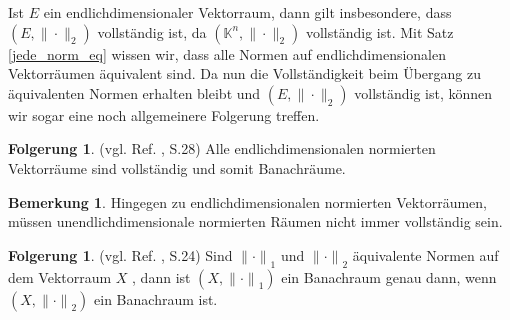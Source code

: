 \documentclass[10pt,a4paper]{article}
\theoremstyle{plain}
\theoremstyle{definition}
\newtheorem{folgerung}[satz]{Folgerung}
\newenvironment{fol}{\begin{shaded}\begin{folgerung}}{\end{folgerung}\end{shaded}}
\theoremstyle{nonumberplain}
\newtheorem{bemerkung}{Bemerkung}
\newenvironment{bem}{\begin{bemerkung}}{\end{bemerkung}}
\newcommand{\K}{\mathbb{K}}
\begin{document}
Ist $E$ ein endlichdimensionaler Vektorraum, dann gilt insbesondere, dass $(E, \|\cdot\|_2)$ vollständig ist, da $(\K^n, \|\cdot\|_2)$ vollständig ist.
Mit Satz \hyperref[jede_norm_eq]{\ref*{jede_norm_eq}} wissen wir, dass alle Normen auf endlichdimensionalen Vektorräumen äquivalent sind. Da nun die Vollständigkeit beim Übergang zu äquivalenten Normen erhalten bleibt und $(E, \|\cdot\|_2)$ vollständig ist, können wir sogar eine noch allgemeinere Folgerung treffen. 
\begin{fol}
\label{vollundendlich}
(vgl. Ref. \cite{Clason}, S.28) Alle endlichdimensionalen normierten Vektorräume sind vollständig und somit Banachräume.
\end{fol}
\begin{bem}
Hingegen zu endlichdimensionalen normierten Vektorräumen, müssen unendlichdimensionale normierten Räumen nicht immer vollständig sein.
\end{bem}
\begin{fol}
(vgl. Ref. \cite{Clason}, S.24) Sind ${\|\cdot\|}_1$ und ${\|\cdot\|}_2$ äquivalente Normen auf dem Vektorraum $X$ , dann ist $(X , {\|\cdot\|}_1)$ ein Banachraum genau dann, wenn $(X , {\|\cdot\|}_2)$ ein Banachraum ist.
\end{fol}
\newpage

\end{document}
